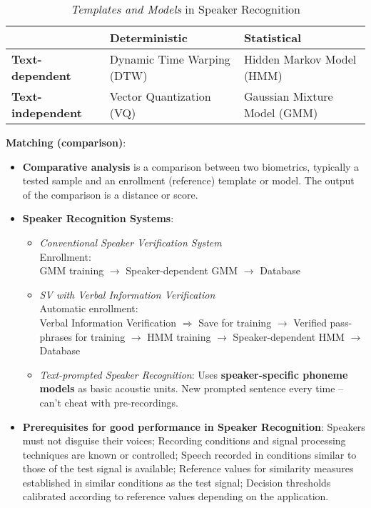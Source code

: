 \documentclass[a4paper]{article}
\begin{document}
        \begin{table}[htp]
          \centering
          \begin{tabular}{lll}
          \toprule
          & \textbf{Deterministic}    & \textbf{Statistical}   \\
          \midrule
          \textbf{Text-dependent}       & Dynamic Time Warping (DTW) & Hidden Markov Model (HMM)      \\
          \textbf{Text-independent}     & Vector Quantization (VQ)   & Gaussian Mixture Model (GMM)   \\
          \bottomrule
          \end{tabular}
          \caption{\emph{Templates and Models} in Speaker Recognition}
          \label{tab:spk}
        \end{table}

      \textbf{Matching (comparison)}:
      \begin{itemize}
        \item \textbf{Comparative analysis} is a comparison between two biometrics, typically a tested sample and an enrollment (reference) template or model. The output of the comparison is a distance or score.
        \item \textbf{Speaker Recognition Systems}:
        \begin{itemize}
          \item \emph{Conventional Speaker Verification System}\\Enrollment: \\
          GMM training $\rightarrow$ Speaker-dependent GMM $\rightarrow$ Database
          \item \emph{SV with Verbal Information Verification}\\Automatic enrollment: \\
          Verbal Information Verification $\Rightarrow$ Save for training $\rightarrow$ Verified pass-phrases for training $\rightarrow$ HMM training $\rightarrow$ Speaker-dependent HMM $\rightarrow$ Database
          \item \emph{Text-prompted Speaker Recognition}: Uses \textbf{speaker-specific phoneme models} as basic acoustic units. New prompted sentence every time -- can't cheat with pre-recordings.
        \end{itemize}
        \item \textbf{Prerequisites for good performance in Speaker Recognition}: Speakers must not disguise their voices; Recording conditions and signal processing techniques are known or controlled; Speech recorded in conditions similar to those of the test signal is available; Reference values for similarity measures established in similar conditions as the test signal; Decision thresholds calibrated according to reference values depending on the application.
      \end{itemize}
\end{document}
